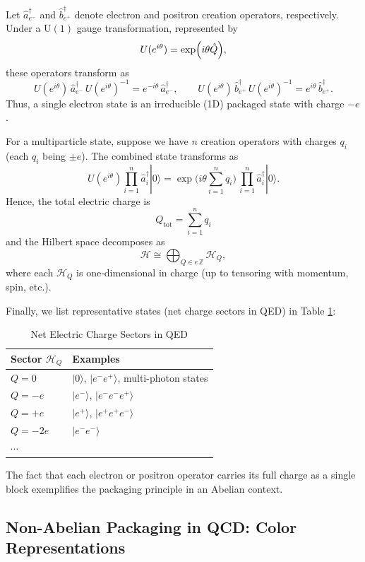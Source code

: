 \documentclass[12pt,a4paper]{article}
\begin{document}
  
Let $\hat{a}^\dagger_{e^-}$ and $\hat{b}^\dagger_{e^+}$ denote electron and positron creation operators, respectively. Under a $\mathrm{U}(1)$ gauge transformation, represented by
\[
U(e^{i\theta}) = \exp \Bigl(i\theta \hat{Q}\Bigr),
\]
these operators transform as
\[
U(e^{i\theta})\, \hat{a}^\dagger_{e^-}\, U(e^{i\theta})^{-1} = e^{-i\theta}\, \hat{a}^\dagger_{e^-}, \qquad
U(e^{i\theta})\, \hat{b}^\dagger_{e^+}\, U(e^{i\theta})^{-1} = e^{i\theta}\, \hat{b}^\dagger_{e^+}.
\]
Thus, a single electron state is an irreducible (1D) packaged state with charge $-e$.

For a multiparticle state, suppose we have $n$ creation operators with charges $q_i$ (each $q_i$ being $\pm e$). The combined state transforms as
\[
U(e^{i\theta}) \prod_{i=1}^n \hat{a}^\dagger_{i} |0\rangle
= \exp\!\bigl(i\theta \sum_{i=1}^n q_i \bigr)\,
\prod_{i=1}^n \hat{a}^\dagger_{i} |0\rangle.
\]
Hence, the total electric charge is
\[
Q_{\mathrm{tot}} = \sum_{i=1}^n q_i
\]
and the Hilbert space decomposes as
\[
\mathcal{H} \cong \bigoplus_{Q \in e\,\mathbb{Z}} \mathcal{H}_Q,
\]
where each $\mathcal{H}_Q$ is one‐dimensional in charge (up to tensoring with momentum, spin, etc.).


Finally, we list representative states (net charge sectors in QED) in Table \ref{TAB:NetElectricChargeSectorsQED}:

\begin{table}[h]
	\centering
	\caption{Net Electric Charge Sectors in QED}
	\begin{tabular}{|l|l|}
		\hline
		Sector $\mathcal{H}_Q$ & Examples \\ \hline
		$Q=0$  & $\lvert 0 \rangle$, $\lvert e^-e^+\rangle$, multi-photon states \\ \hline
		$Q=-e$ & $\lvert e^-\rangle$, $\lvert e^-e^-e^+\rangle$ \\ \hline
		$Q=+e$ & $\lvert e^+\rangle$, $\lvert e^+e^+e^-\rangle$ \\ \hline
		$Q=-2e$ & $\lvert e^-e^-\rangle$ \\ \hline
		$\cdots$ &  \\ \hline
	\end{tabular}
	\label{TAB:NetElectricChargeSectorsQED}
\end{table}


The fact that each electron or positron operator carries its full charge as a single block exemplifies the packaging principle in an Abelian context.



\subsection{Non-Abelian Packaging in QCD: Color Representations}
\end{document}
